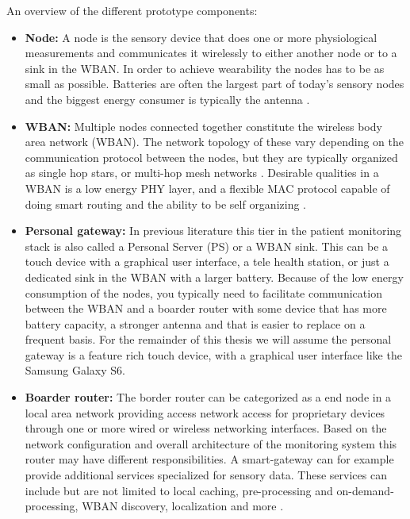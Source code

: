 An overview of the different prototype components:
\begin{itemize}

  \item \textbf{Node:} A node is the sensory device that does one or more physiological measurements and communicates it wirelessly to either another node or to a sink in the WBAN. In order to achieve wearability the nodes has to be as small as possible. Batteries are often the largest part of today’s sensory nodes and the biggest energy consumer is typically the antenna \cite{Ullah:2010ci}.

  \item \textbf{WBAN:} Multiple nodes connected together constitute the wireless body area network (WBAN). The network topology of these vary depending on the communication protocol between the nodes, but they are typically organized as single hop stars, or multi-hop mesh networks \cite{Anonymous:6F6UBBK9}. Desirable qualities in a WBAN is a low energy PHY layer, and a flexible MAC protocol capable of doing smart routing and the ability to be self organizing \cite{Anonymous:XKViPHhV} \cite{Anonymous:OEjzuKTe}.

  \item \textbf{Personal gateway:} In previous literature this tier in the patient monitoring stack is also called a Personal Server (PS) or a WBAN sink. This can be a touch device with a graphical user interface, a tele health station, or just a dedicated sink in the WBAN with a larger battery. Because of the low energy consumption of the nodes, you typically need to facilitate communication between the WBAN and a boarder router with some device that has more battery capacity, a stronger antenna and that is easier to replace on a frequent basis. For the remainder of this thesis we will assume the personal gateway is a feature rich touch device, with a graphical user interface like the Samsung Galaxy S6.

  \item \textbf{Boarder router:} The border router can be categorized as a end node in a local area network providing access network access for proprietary devices through one or more wired or wireless networking interfaces. Based on the network configuration and overall architecture of the monitoring system this router may have different responsibilities. A smart-gateway can for example provide additional services specialized for sensory data. These services can include but are not limited to local caching, pre-processing and on-demand-processing, WBAN discovery, localization and more \cite{DrAmirMohammadRahmani:2014vx}.


\end{itemize}
